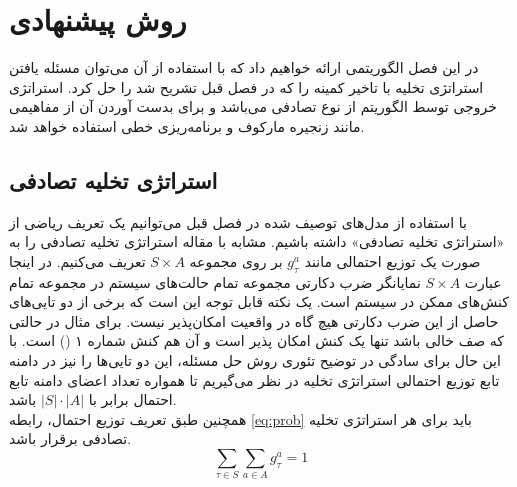 \chapter{روش پیشنهادی}
در این فصل الگوریتمی ارائه خواهیم داد که با استفاده از آن می‌توان مسئله یافتن استراتژی تخلیه با تاخیر کمینه را که در فصل قبل تشریح شد را حل کرد. استراتژی خروجی توسط الگوریتم از نوع تصادفی می‌باشد و برای بدست آوردن آن از مفاهیمی مانند زنجیره مارکوف و برنامه‌ریزی خطی استفاده خواهد شد.

\section{استراتژی تخلیه تصادفی}
با استفاده از مدل‌های توصیف شده در فصل قبل می‌توانیم یک تعریف ریاضی از «استراتژی تخلیه تصادفی» داشته باشیم. مشابه با مقاله \cite{Liu} استراتژی تخلیه تصادفی را به صورت یک توزیع احتمالی مانند \(g_\tau^a\) بر روی مجموعه \(S \times A\) تعریف می‌کنیم. در اینجا عبارت \(S \times A\) نمایانگر ضرب دکارتی مجموعه تمام حالت‌های سیستم در مجموعه تمام کنش‌های ممکن در سیستم است. یک نکته قابل توجه این است که برخی از دو تایی‌های حاصل از این ضرب دکارتی هیچ گاه در واقعیت امکان‌پذیر نیست. برای مثال در حالتی که صف خالی باشد تنها یک کنش امکان پذیر است و آن هم کنش شماره ۱ () است. با این حال برای سادگی در توضیح تئوری روش حل مسئله، این دو تایی‌ها را نیز در دامنه تابع توزیع احتمالی استراتژی تخلیه در نظر می‌گیریم تا همواره تعداد اعضای دامنه تابع احتمال برابر با \(|S| \cdot |A|\) باشد. \\

همچنین طبق تعریف توزیع احتمال، رابطه \ref{eq:prob} باید برای هر استراتژی تخلیه تصادفی برقرار باشد.
\begin{equation}
	\label{eq:prob}
	\sum_{\tau \in S} \sum_{a \in A} g_{\tau}^{a}=1
\end{equation}
